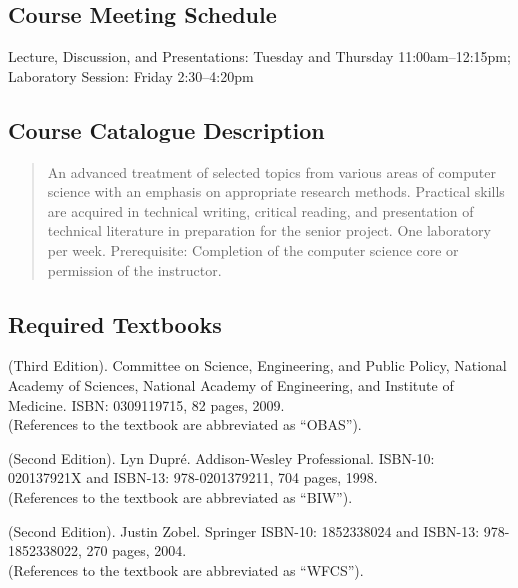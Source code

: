 \vspace{-.1in}
\subsection*{Course Meeting Schedule}

Lecture, Discussion, and Presentations: Tuesday and Thursday
11:00am--12:15pm; \\ Laboratory Session: Friday 2:30--4:20pm

\vspace{-.15in}
\subsection*{Course Catalogue Description}

\begin{quote} 
  
  An advanced treatment of selected topics from various areas of computer science with an emphasis on appropriate
  research methods.  Practical skills are acquired in technical writing, critical reading, and presentation of technical
  literature in preparation for the senior project. One laboratory per week. Prerequisite: Completion of the computer
  science core or permission of the instructor.  

\end{quote}

\vspace{-.25in}
\subsection*{Required Textbooks}

 (Third Edition).  Committee on Science,
Engineering, and Public Policy, National Academy of Sciences, National Academy of Engineering, and Institute of
Medicine. ISBN: 0309119715, 82 pages, 2009.\\ (References to the textbook are abbreviated as ``OBAS'').

 (Second Edition). Lyn Dupr\'e.  Addison-Wesley
Professional.  ISBN-10: 020137921X and ISBN-13: 978-0201379211, 704 pages, 1998.\\ (References to the textbook are
abbreviated as ``BIW'').

 (Second Edition).  Justin Zobel.  Springer ISBN-10: 1852338024 and ISBN-13:
978-1852338022, 270 pages, 2004. \\ (References to the textbook are abbreviated as ``WFCS'').

